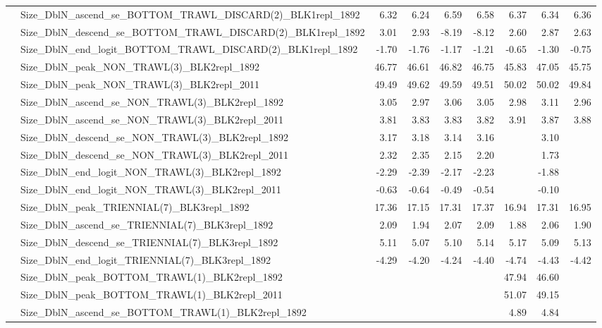 \documentclass[
]{scrartcl}
\begin{document}
\begin{landscape}
\begin{longtable}{llrrrrrrr}
 & Size\_DblN\_ascend\_se\_BOTTOM\_TRAWL\_DISCARD(2)\_BLK1repl\_1892 & 6.32 & 6.24 & 6.59 & 6.58 & 6.37 & 6.34 & 6.36 \\ 
 & Size\_DblN\_descend\_se\_BOTTOM\_TRAWL\_DISCARD(2)\_BLK1repl\_1892 & 3.01 & 2.93 & -8.19 & -8.12 & 2.60 & 2.87 & 2.63 \\ 
 & Size\_DblN\_end\_logit\_BOTTOM\_TRAWL\_DISCARD(2)\_BLK1repl\_1892 & -1.70 & -1.76 & -1.17 & -1.21 & -0.65 & -1.30 & -0.75 \\ 
 & Size\_DblN\_peak\_NON\_TRAWL(3)\_BLK2repl\_1892 & 46.77 & 46.61 & 46.82 & 46.75 & 45.83 & 47.05 & 45.75 \\ 
 & Size\_DblN\_peak\_NON\_TRAWL(3)\_BLK2repl\_2011 & 49.49 & 49.62 & 49.59 & 49.51 & 50.02 & 50.02 & 49.84 \\ 
 & Size\_DblN\_ascend\_se\_NON\_TRAWL(3)\_BLK2repl\_1892 & 3.05 & 2.97 & 3.06 & 3.05 & 2.98 & 3.11 & 2.96 \\ 
 & Size\_DblN\_ascend\_se\_NON\_TRAWL(3)\_BLK2repl\_2011 & 3.81 & 3.83 & 3.83 & 3.82 & 3.91 & 3.87 & 3.88 \\ 
 & Size\_DblN\_descend\_se\_NON\_TRAWL(3)\_BLK2repl\_1892 & 3.17 & 3.18 & 3.14 & 3.16 &  & 3.10 &  \\ 
 & Size\_DblN\_descend\_se\_NON\_TRAWL(3)\_BLK2repl\_2011 & 2.32 & 2.35 & 2.15 & 2.20 &  & 1.73 &  \\ 
 & Size\_DblN\_end\_logit\_NON\_TRAWL(3)\_BLK2repl\_1892 & -2.29 & -2.39 & -2.17 & -2.23 &  & -1.88 &  \\ 
 & Size\_DblN\_end\_logit\_NON\_TRAWL(3)\_BLK2repl\_2011 & -0.63 & -0.64 & -0.49 & -0.54 &  & -0.10 &  \\ 
 & Size\_DblN\_peak\_TRIENNIAL(7)\_BLK3repl\_1892 & 17.36 & 17.15 & 17.31 & 17.37 & 16.94 & 17.31 & 16.95 \\ 
 & Size\_DblN\_ascend\_se\_TRIENNIAL(7)\_BLK3repl\_1892 & 2.09 & 1.94 & 2.07 & 2.09 & 1.88 & 2.06 & 1.90 \\ 
 & Size\_DblN\_descend\_se\_TRIENNIAL(7)\_BLK3repl\_1892 & 5.11 & 5.07 & 5.10 & 5.14 & 5.17 & 5.09 & 5.13 \\ 
 & Size\_DblN\_end\_logit\_TRIENNIAL(7)\_BLK3repl\_1892 & -4.29 & -4.20 & -4.24 & -4.40 & -4.74 & -4.43 & -4.42 \\ 
 & Size\_DblN\_peak\_BOTTOM\_TRAWL(1)\_BLK2repl\_1892 &  &  &  &  & 47.94 & 46.60 &  \\ 
 & Size\_DblN\_peak\_BOTTOM\_TRAWL(1)\_BLK2repl\_2011 &  &  &  &  & 51.07 & 49.15 &  \\ 
 & Size\_DblN\_ascend\_se\_BOTTOM\_TRAWL(1)\_BLK2repl\_1892 &  &  &  &  & 4.89 & 4.84 &  \\ 

\end{longtable}
\end{landscape}
\end{document}
